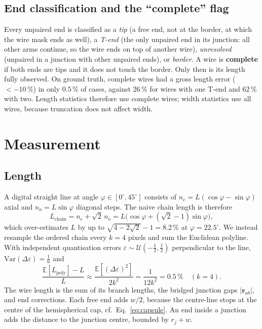 \documentclass[11pt,a4paper]{article}
\newcommand{\E}{\mathbb{E}}
\begin{document}
\subsection{End classification and the ``complete'' flag}
Every unpaired end is classified as a \emph{tip} (a free end, not at the border, at which the wire mask ends as well), a \emph{T-end} (the only unpaired end in its junction: all other arms continue, so the wire ends on top of another wire), \emph{unresolved} (unpaired in a junction with other unpaired ends), or \emph{border}. A wire is \textbf{complete} if both ends are tips and it does not touch the border. Only then is its length fully observed. On ground truth, complete wires had a gross length error ($<-10\,\%$) in only $0.5\,\%$ of cases, against 26\,\% for wires with one T-end and 62\,\% with two. Length statistics therefore use complete wires; width statistics use all wires, because truncation does not affect width.

\section{Measurement}\label{sec:measure}
\subsection{Length}
A digital straight line at angle $\varphi\in[0^\circ,45^\circ]$ consists of $n_e=L(\cos\varphi-\sin\varphi)$ axial and $n_o=L\sin\varphi$ diagonal steps. The naive chain length is therefore
\begin{equation}
L_{\text{chain}}=n_e+\sqrt2\,n_o=L\bigl(\cos\varphi+(\sqrt2-1)\sin\varphi\bigr),
\end{equation}
which over-estimates $L$ by up to $\sqrt{4-2\sqrt2}-1=8.2\,\%$ at $\varphi=22.5^\circ$. We instead resample the ordered chain every $k=4$ pixels and sum the Euclidean polyline. With independent quantisation errors $\varepsilon\sim\mathcal U(-\tfrac12,\tfrac12)$ perpendicular to the line, $\mathrm{Var}(\Delta\varepsilon)=\tfrac16$ and
\begin{equation}
\frac{\E[L_{\text{poly}}]-L}{L}\approx\frac{\E[(\Delta\varepsilon)^2]}{2k^2}=\frac1{12k^2}=0.5\,\%\quad(k=4).
\end{equation}
The wire length is the sum of its branch lengths, the bridged junction gaps $|\mathbf r_{ab}|$, and end corrections. Each free end adds $w/2$, because the centre-line stops at the centre of the hemispherical cap, cf.\ Eq.~\eqref{eq:capsule}. An end inside a junction adds the distance to the junction centre, bounded by $r_j+w$.
\end{document}

